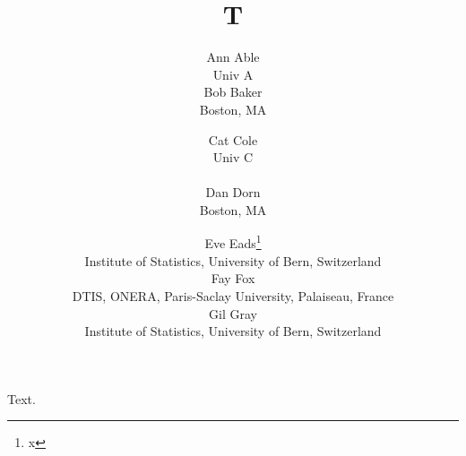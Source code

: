 \documentclass{article}
\title{T}
\author{Ann Able \\
Univ A \\[12pt]
Bob Baker \\
Boston, MA
\and Cat Cole \\
Univ C \\
\vspace{12pt} \\
Dan Dorn \\
Boston, MA
\and Eve Eads\thanks{x} \\
\small{Institute of Statistics, University of Bern, Switzerland} \\[5pt]
Fay Fox \\
\small{DTIS, ONERA, Paris-Saclay University, Palaiseau, France} \\[5pt]
Gil Gray \\
\small{Institute of Statistics, University of Bern, Switzerland}}
\begin{document}
\maketitle
Text.
\end{document}
